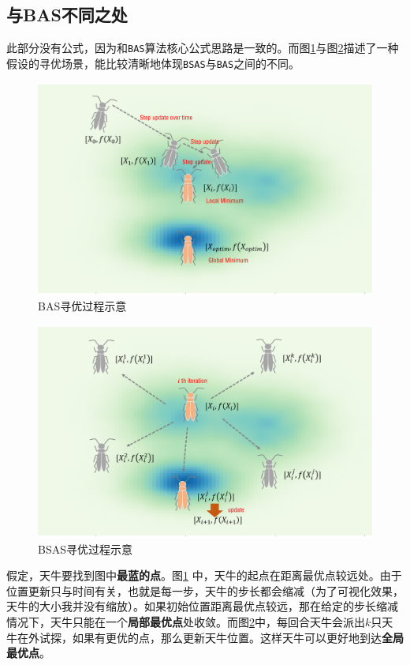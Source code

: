 \documentclass[]{ctexbook}
\theoremstyle{definition}
\theoremstyle{definition}
\theoremstyle{definition}
\theoremstyle{remark}
\begin{document}
\subsection{与BAS不同之处}\label{BSASflow}

此部分没有公式，因为和\texttt{BAS}算法核心公式思路是一致的。而图\ref{fig:basflow}与图\ref{fig:bsasflow}描述了一种假设的寻优场景，能比较清晰地体现\texttt{BSAS}与\texttt{BAS}之间的不同。

\begin{figure}

{\centering \includegraphics[width=0.8\linewidth]{img/BAS} 

}

\caption{BAS寻优过程示意}\label{fig:basflow}
\end{figure}

\begin{figure}

{\centering \includegraphics[width=0.8\linewidth]{img/BSAS} 

}

\caption{BSAS寻优过程示意}\label{fig:bsasflow}
\end{figure}

假定，天牛要找到图中\textbf{最蓝的点}。图\ref{fig:basflow}
中，天牛的起点在距离最优点较远处。由于位置更新只与时间有关，也就是每一步，天牛的步长都会缩减（为了可视化效果，天牛的大小我并没有缩放）。如果初始位置距离最优点较远，那在给定的步长缩减情况下，天牛只能在一个\textbf{局部最优点}处收敛。而图\ref{fig:bsasflow}中，每回合天牛会派出\(k\)只天牛在外试探，如果有更优的点，那么更新天牛位置。这样天牛可以更好地到达\textbf{全局最优点}。
\end{document}
